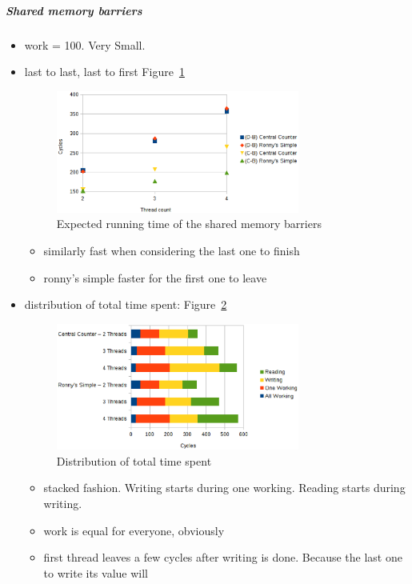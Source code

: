 \documentclass[a4paper, 10pt]{article}
\begin{document}
\subparagraph{Shared memory barriers}
\label{sssssec:analysis-modelchecking-quantitative-properties-results-shared}
\begin{itemize}
	\item work = 100. Very Small.
	\item last to last, last to first Figure~\ref{fig:cs-work-100-B-C-D}
		\begin{figure}[htbp]
			\centering
			\includegraphics[width=8cm]{charts/cs-work-100-B-C-D}
			\caption{Expected running time of the shared memory barriers}
			\label{fig:cs-work-100-B-C-D}
		\end{figure}
		\begin{itemize}
			\item similarly fast when considering the last one to finish
			\item ronny's simple faster for the first one to leave
		\end{itemize}
	\item distribution of total time spent: Figure~\ref{fig:cs-work-100-partition}
		\begin{figure}[htbp]
			\centering
			\includegraphics[width=8cm]{charts/cs-work-100-partition}
			\caption{Distribution of total time spent}
			\label{fig:cs-work-100-partition}
		\end{figure}
		\begin{itemize}
			\item stacked fashion. Writing starts during one working. Reading starts during writing.
			\item work is equal for everyone, obviously
			\item first thread leaves a few cycles after writing is done. Because the last one to write its value will

\end{itemize}
\end{itemize}
\end{document}

